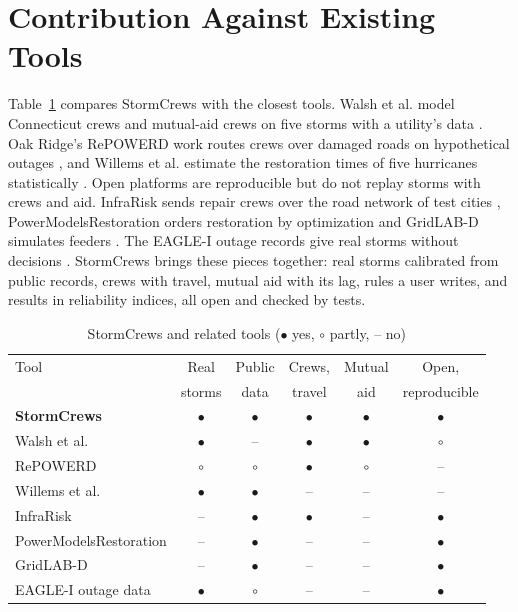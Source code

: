 \documentclass[conference,letterpaper]{IEEEtran}
\begin{document}
\section{Contribution Against Existing Tools}\label{sec:related}

Table~\ref{tab:related} compares StormCrews with the closest tools. Walsh et al. model Connecticut crews and
mutual-aid crews on five storms with a utility's data \cite{walsh2018abm}. Oak Ridge's RePOWERD work routes crews over
damaged roads on hypothetical outages \cite{kar2022repowrd,chen2023multiagent}, and Willems et al. estimate the
restoration times of five hurricanes statistically \cite{willems2024probabilistic}. Open platforms are reproducible
but do not replay storms with crews and aid. InfraRisk sends repair crews over the road network of test cities
\cite{balakrishnan2022infrarisk}, PowerModelsRestoration orders restoration by optimization
\cite{rhodes2021powermodelsrestoration} and GridLAB-D simulates feeders \cite{chassin2014gridlabd}. The EAGLE-I
outage records give real storms without decisions \cite{brelsford2024eaglei}. StormCrews brings these pieces together:
real storms calibrated from public records, crews with travel, mutual aid with its lag, rules a user writes, and
results in reliability indices, all open and checked by \nTests{} tests.

\begin{table}[t]
\caption{StormCrews and related tools ($\bullet$ yes, $\circ$ partly, -- no)}
\label{tab:related}
\centering\scriptsize
\setlength{\tabcolsep}{2.2pt}
\begin{tabular}{@{}lccccc@{}}
\toprule
Tool & Real & Public & Crews, & Mutual & Open, \\
 & storms & data & travel & aid & reproducible \\
\midrule
\textbf{StormCrews} & $\bullet$ & $\bullet$ & $\bullet$ & $\bullet$ & $\bullet$ \\
Walsh et al. \cite{walsh2018abm} & $\bullet$ & -- & $\bullet$ & $\bullet$ & $\circ$ \\
RePOWERD \cite{kar2022repowrd,chen2023multiagent} & $\circ$ & $\circ$ & $\bullet$ & $\circ$ & -- \\
Willems et al. \cite{willems2024probabilistic} & $\bullet$ & $\bullet$ & -- & -- & -- \\
InfraRisk \cite{balakrishnan2022infrarisk} & -- & $\bullet$ & $\bullet$ & -- & $\bullet$ \\
PowerModelsRestoration \cite{rhodes2021powermodelsrestoration} & -- & $\bullet$ & -- & -- & $\bullet$ \\
GridLAB-D \cite{chassin2014gridlabd} & -- & $\bullet$ & -- & -- & $\bullet$ \\
EAGLE-I outage data \cite{brelsford2024eaglei} & $\bullet$ & $\circ$ & -- & -- & $\bullet$ \\
\bottomrule
\end{tabular}
\end{table}
\end{document}
